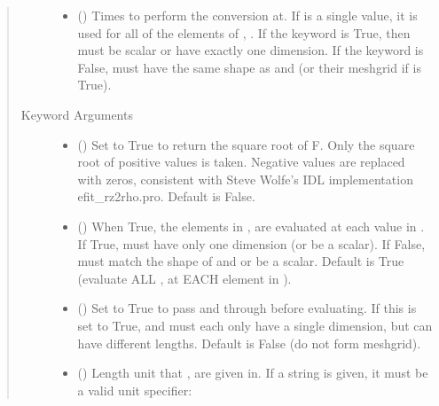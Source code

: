 \documentclass[letterpaper,10pt,english]{sphinxmanual}
\begin{document}
\begin{fulllineitems}
\begin{fulllineitems}
\begin{quote}
\begin{description}
\begin{itemize}
\item {} 
 () \textendash{} Times to perform the conversion at.
If  is a single value, it is used for all of the elements of
, . If the  keyword is True, then  must be
scalar or have exactly one dimension. If the  keyword is
False,  must have the same shape as  and  (or their
meshgrid if  is True).

\end{itemize}

\item[{Keyword Arguments}] \leavevmode\begin{itemize}
\item {} 
 () \textendash{} Set to True to return the square root of F.
Only the square root of positive values is taken. Negative
values are replaced with zeros, consistent with Steve Wolfe’s
IDL implementation efit\_rz2rho.pro. Default is False.

\item {} 
 () \textendash{} When True, the elements in ,  are evaluated
at each value in . If True,  must have only one dimension
(or be a scalar). If False,  must match the shape of  and
 or be a scalar. Default is True (evaluate ALL ,  at
EACH element in ).

\item {} 
 () \textendash{} Set to True to pass  and  through
 before evaluating. If this is set to
True,  and  must each only have a single dimension, but
can have different lengths. Default is False (do not form
meshgrid).

\item {} 
 () \textendash{} 
Length unit that ,  are given in.
If a string is given, it must be a valid unit specifier:
\begin{quote}



\end{quote}
\end{itemize}
\end{description}
\end{quote}
\end{fulllineitems}
\end{fulllineitems}
\end{document}
